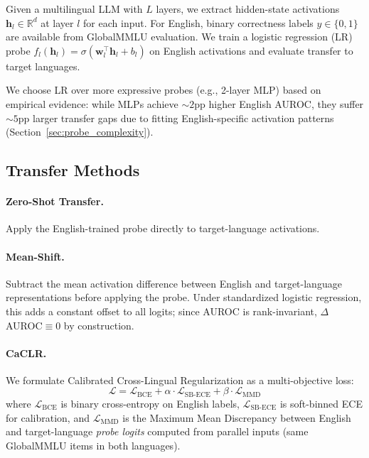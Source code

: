 \documentclass[11pt,a4paper]{article}
\newcommand{\auroc}{AUROC}
\begin{document}
Given a multilingual LLM with $L$ layers, we extract hidden-state activations $\mathbf{h}_l \in \mathbb{R}^d$ at layer $l$ for each input. For English, binary correctness labels $y \in \{0,1\}$ are available from GlobalMMLU evaluation. We train a logistic regression (LR) probe $f_l(\mathbf{h}_l) = \sigma(\mathbf{w}_l^\top \mathbf{h}_l + b_l)$ on English activations and evaluate transfer to target languages.

We choose LR over more expressive probes (e.g., 2-layer MLP) based on empirical evidence: while MLPs achieve ${\sim}2$pp higher English \auroc{}, they suffer ${\sim}5$pp larger transfer gaps due to fitting English-specific activation patterns (Section~\ref{sec:probe_complexity}).

\subsection{Transfer Methods}

\paragraph{Zero-Shot Transfer.} Apply the English-trained probe directly to target-language activations.

\paragraph{Mean-Shift.} Subtract the mean activation difference between English and target-language representations before applying the probe. Under standardized logistic regression, this adds a constant offset to all logits; since \auroc{} is rank-invariant, $\Delta$\auroc{}$\equiv 0$ by construction.

\paragraph{CaCLR.}
We formulate Calibrated Cross-Lingual Regularization as a multi-objective loss:
\begin{equation}
\mathcal{L} = \mathcal{L}_{\text{BCE}} + \alpha \cdot \mathcal{L}_{\text{SB-ECE}} + \beta \cdot \mathcal{L}_{\text{MMD}}
\end{equation}
where $\mathcal{L}_{\text{BCE}}$ is binary cross-entropy on English labels, $\mathcal{L}_{\text{SB-ECE}}$ is soft-binned ECE for calibration, and $\mathcal{L}_{\text{MMD}}$ is the Maximum Mean Discrepancy between English and target-language \emph{probe logits} computed from parallel inputs (same GlobalMMLU items in both languages).
\end{document}
